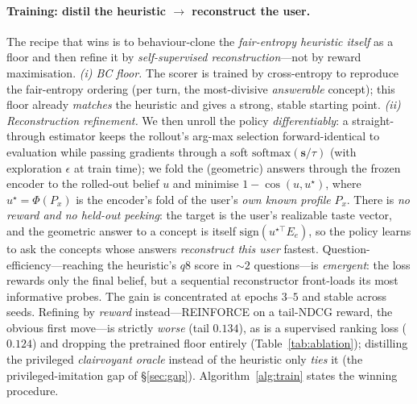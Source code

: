 \documentclass[11pt]{article}
\begin{document}
\paragraph{Training: distil the heuristic $\to$ reconstruct the user.} The recipe that wins is to behaviour-clone the
\emph{fair-entropy heuristic itself} as a floor and then refine it by \emph{self-supervised reconstruction}---not by
reward maximisation. \emph{(i) BC floor.} The scorer is trained by cross-entropy to reproduce the fair-entropy ordering
(per turn, the most-divisive \emph{answerable} concept); this floor already \emph{matches} the heuristic and gives a
strong, stable starting point. \emph{(ii) Reconstruction refinement.} We then unroll the policy \emph{differentiably}: a
straight-through estimator keeps the rollout's arg-max selection forward-identical to evaluation while passing gradients
through a soft $\mathrm{softmax}(\mathbf{s}/\tau)$ (with exploration $\epsilon$ at train time); we fold the (geometric)
answers through the frozen encoder to the rolled-out belief $u$ and minimise $1-\cos(u,u^\star)$, where $u^\star=\Phi(P_x)$
is the encoder's fold of the user's \emph{own known profile} $P_x$. There is \emph{no reward and no held-out peeking}: the
target is the user's realizable taste vector, and the geometric answer to a concept is itself $\mathrm{sign}(u^{\star\top}E_e)$,
so the policy learns to ask the concepts whose answers \emph{reconstruct this user} fastest. Question-efficiency---reaching
the heuristic's $q8$ score in $\sim\!2$ questions---is \emph{emergent}: the loss rewards only the final belief, but a
sequential reconstructor front-loads its most informative probes. The gain is concentrated at epochs $3$--$5$ and
stable across seeds.
Refining by \emph{reward} instead---REINFORCE on a tail-NDCG reward, the obvious first move---is strictly \emph{worse}
(tail $0.134$), as is a supervised ranking loss ($0.124$) and dropping the pretrained floor entirely
(Table~\ref{tab:ablation}); distilling the privileged \emph{clairvoyant oracle} instead of the heuristic only \emph{ties}
it (the privileged-imitation gap of \S\ref{sec:gap}). Algorithm~\ref{alg:train} states the winning procedure.
\end{document}
